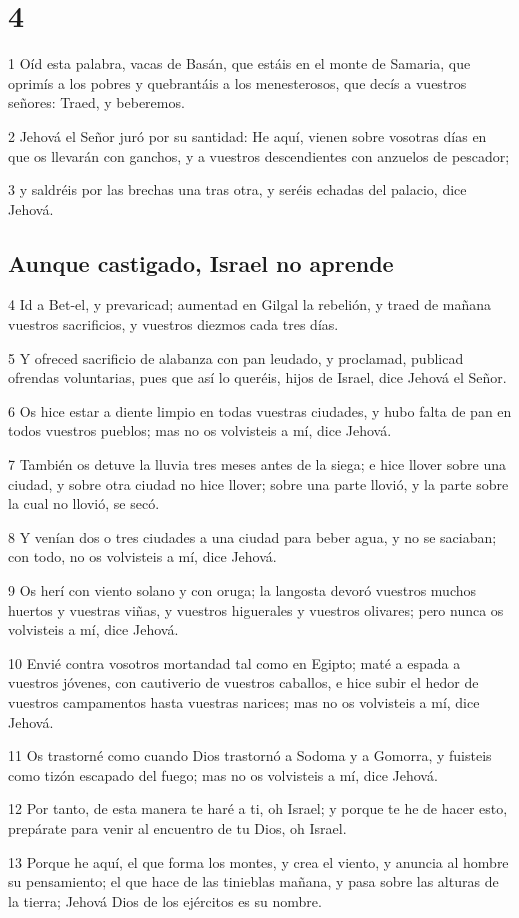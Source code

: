 \chapter{4}

\par 1 Oíd esta palabra, vacas de Basán, que estáis en el monte de Samaria, que oprimís a los pobres y quebrantáis a los menesterosos, que decís a vuestros señores: Traed, y beberemos.
\par 2 Jehová el Señor juró por su santidad: He aquí, vienen sobre vosotras días en que os llevarán con ganchos, y a vuestros descendientes con anzuelos de pescador;
\par 3 y saldréis por las brechas una tras otra, y seréis echadas del palacio, dice Jehová.

\section*{Aunque castigado, Israel no aprende}

\par 4 Id a Bet-el, y prevaricad; aumentad en Gilgal la rebelión, y traed de mañana vuestros sacrificios, y vuestros diezmos cada tres días.
\par 5 Y ofreced sacrificio de alabanza con pan leudado, y proclamad, publicad ofrendas voluntarias, pues que así lo queréis, hijos de Israel, dice Jehová el Señor.
\par 6 Os hice estar a diente limpio en todas vuestras ciudades, y hubo falta de pan en todos vuestros pueblos; mas no os volvisteis a mí, dice Jehová.
\par 7 También os detuve la lluvia tres meses antes de la siega; e hice llover sobre una ciudad, y sobre otra ciudad no hice llover; sobre una parte llovió, y la parte sobre la cual no llovió, se secó.
\par 8 Y venían dos o tres ciudades a una ciudad para beber agua, y no se saciaban; con todo, no os volvisteis a mí, dice Jehová.
\par 9 Os herí con viento solano y con oruga; la langosta devoró vuestros muchos huertos y vuestras viñas, y vuestros higuerales y vuestros olivares; pero nunca os volvisteis a mí, dice Jehová.
\par 10 Envié contra vosotros mortandad tal como en Egipto; maté a espada a vuestros jóvenes, con cautiverio de vuestros caballos, e hice subir el hedor de vuestros campamentos hasta vuestras narices; mas no os volvisteis a mí, dice Jehová.
\par 11 Os trastorné como cuando Dios trastornó a Sodoma y a Gomorra, y fuisteis como tizón escapado del fuego; mas no os volvisteis a mí, dice Jehová.
\par 12 Por tanto, de esta manera te haré a ti, oh Israel; y porque te he de hacer esto, prepárate para venir al encuentro de tu Dios, oh Israel.
\par 13 Porque he aquí, el que forma los montes, y crea el viento, y anuncia al hombre su pensamiento; el que hace de las tinieblas mañana, y pasa sobre las alturas de la tierra; Jehová Dios de los ejércitos es su nombre.

